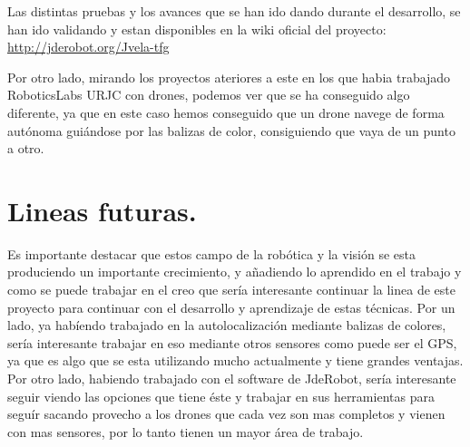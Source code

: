 \hspace{1cm} Las distintas pruebas y los avances que se han ido dando durante el desarrollo, se han ido validando y estan disponibles en la wiki oficial del proyecto:\\
\underline{\url{http://jderobot.org/Jvela-tfg}}

\hspace{1cm} Por otro lado, mirando los proyectos ateriores a este en los que habia trabajado RoboticsLabs URJC con drones, podemos ver que se ha conseguido algo diferente, ya que en este caso hemos conseguido que un drone navege de forma aut\'onoma gui\'andose por las balizas de color, consiguiendo que vaya de un punto a otro. 


\section{Lineas futuras.}

\hspace{1cm}Es importante destacar que estos campo de la rob\'otica y la visi\'on se esta produciendo un importante crecimiento, y añadiendo lo aprendido en el trabajo y como se puede trabajar en el creo que ser\'ia interesante continuar la linea de este proyecto para continuar con el desarrollo y aprendizaje de estas t\'ecnicas. Por un lado, ya hab\'iendo trabajado en la autolocalizaci\'on mediante balizas de colores, ser\'ia interesante trabajar en eso mediante otros sensores como puede ser el GPS, ya que es algo que se esta utilizando mucho actualmente y tiene grandes ventajas. Por otro lado, habiendo trabajado con el software de JdeRobot, ser\'ia interesante seguir viendo las opciones que tiene \'este y trabajar en sus herramientas para segu\'ir sacando provecho a los drones que cada vez son mas completos y vienen con mas sensores, por lo tanto tienen un mayor \'area de trabajo. 






